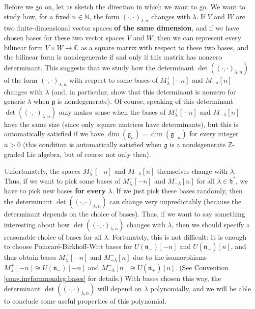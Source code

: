 \documentclass
[numbers=enddot,12pt,final,onecolumn,german,notitlepage]{scrartcl}%
\theoremstyle{definition}
\begin{document}
Before we go on, let us sketch the direction in which we want to go. We want
to study how, for a fixed $n\in\mathbb{N}$, the form $\left(  \cdot
,\cdot\right)  _{\lambda,n}$ changes with $\lambda$. If $V$ and $W$ are two
finite-dimensional vector spaces \textbf{of the same dimension}, and if we
have chosen bases for these two vector spaces $V$ and $W$, then we can
represent every bilinear form $V\times W\rightarrow\mathbb{C}$ as a square
matrix with respect to these two bases, and the bilinear form is nondegenerate
if and only if this matrix has nonzero determinant. This suggests that we
study how the determinant $\det\left(  \left(  \cdot,\cdot\right)
_{\lambda,n}\right)  $ of the form $\left(  \cdot,\cdot\right)  _{\lambda,n}$
with respect to some bases of $M_{\lambda}^{+}\left[  -n\right]  $ and
$M_{-\lambda}^{-}\left[  n\right]  $ changes with $\lambda$ (and, in
particular, show that this determinant is nonzero for generic $\lambda$ when
$\mathfrak{g}$ is nondegenerate). Of course, speaking of this determinant
$\det\left(  \left(  \cdot,\cdot\right)  _{\lambda,n}\right)  $ only makes
sense when the bases of $M_{\lambda}^{+}\left[  -n\right]  $ and $M_{-\lambda
}^{-}\left[  n\right]  $ have the same size (since only square matrices have
determinants), but this is automatically satisfied if we have\textit{ }%
$\dim\left(  \mathfrak{g}_{n}\right)  =\dim\left(  \mathfrak{g}_{-n}\right)  $
for every integer $n>0$ (this condition is automatically satisfied when
$\mathfrak{g}$ is a nondegenerate $\mathbb{Z}$-graded Lie algebra, but of
course not only then).

Unfortunately, the spaces $M_{\lambda}^{+}\left[  -n\right]  $ and
$M_{-\lambda}^{-}\left[  n\right]  $ themselves change with $\lambda$. Thus,
if we want to pick some bases of $M_{\lambda}^{+}\left[  -n\right]  $ and
$M_{-\lambda}^{-}\left[  n\right]  $ for all $\lambda\in\mathfrak{h}^{\ast}$,
we have to pick new bases \textbf{for every }$\lambda$. If we just pick these
bases randomly, then the determinant $\det\left(  \left(  \cdot,\cdot\right)
_{\lambda,n}\right)  $ can change very unpredictably (because the determinant
depends on the choice of bases). Thus, if we want to say something interesting
about how $\det\left(  \left(  \cdot,\cdot\right)  _{\lambda,n}\right)  $
changes with $\lambda$, then we should specify a reasonable choice of bases
for all $\lambda$. Fortunately, this is not difficult: It is enough to choose
Poincar\'{e}-Birkhoff-Witt bases for $U\left(  \mathfrak{n}_{-}\right)
\left[  -n\right]  $ and $U\left(  \mathfrak{n}_{+}\right)  \left[  n\right]
$, and thus obtain bases $M_{\lambda}^{+}\left[  -n\right]  $ and
$M_{-\lambda}^{-}\left[  n\right]  $ due to the isomorphisms $M_{\lambda}%
^{+}\left[  -n\right]  \cong U\left(  \mathfrak{n}_{-}\right)  \left[
-n\right]  $ and $M_{-\lambda}^{-}\left[  n\right]  \cong U\left(
\mathfrak{n}_{+}\right)  \left[  n\right]  $. (See Convention
\ref{conv.invformnondeg.bases} for details.) With bases chosen this way, the
determinant $\det\left(  \left(  \cdot,\cdot\right)  _{\lambda,n}\right)  $
will depend on $\lambda$ polynomially, and we will be able to conclude some
useful properties of this polynomial.
\end{document}

